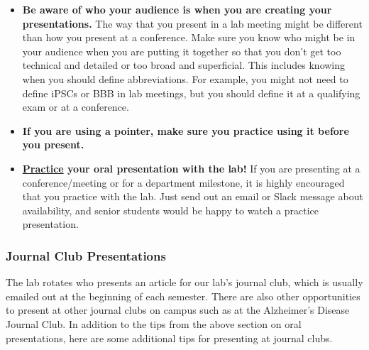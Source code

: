 \documentclass[
]{book}
\begin{document}
\begin{itemize}
\item
  \textbf{Be aware of who your audience is when you are creating your presentations.} The way that you present in a lab meeting might be different than how you present at a conference. Make sure you know who might be in your audience when you are putting it together so that you don't get too technical and detailed or too broad and superficial. This includes knowing when you should define abbreviations. For example, you might not need to define iPSCs or BBB in lab meetings, but you should define it at a qualifying exam or at a conference.
\item
  \textbf{If you are using a pointer, make sure you practice using it before you present.}
\item
  \textbf{\protect\hyperlink{practice}{Practice} your oral presentation with the lab!} If you are presenting at a conference/meeting or for a department milestone, it is highly encouraged that you practice with the lab. Just send out an email or Slack message about availability, and senior students would be happy to watch a practice presentation.
\end{itemize}

\hypertarget{journalclub}{%
\subsubsection{Journal Club Presentations}\label{journalclub}}

The lab rotates who presents an article for our lab's journal club, which is usually emailed out at the beginning of each semester. There are also other opportunities to present at other journal clubs on campus such as at the Alzheimer's Disease Journal Club. In addition to the tips from the above section on oral presentations, here are some additional tips for presenting at journal clubs.
\end{document}
